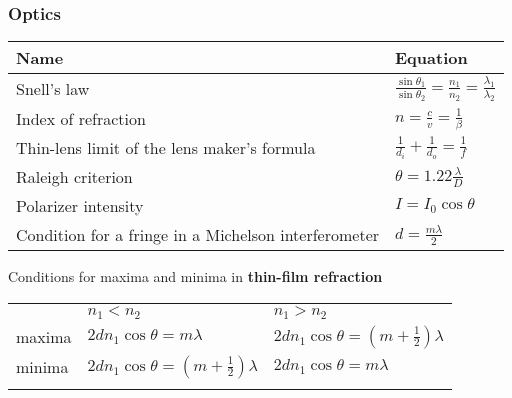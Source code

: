 \documentclass[11pt]{paper}
\begin{document}
\newpage
\subsubsection*{Optics}
\label{subsec:op}

\centering
\label{my-label}
\bgroup
\def\arraystretch{2}
\begin{longtable}{ll}
\textbf{Name}       & \textbf{Equation}          \\ \hline
\multicolumn{1}{|l|}{Snell's law} & \multicolumn{1}{l|}{$\frac{\sin\theta_1}{\sin\theta_2} = \frac{n_1}{n_2} = \frac{\lambda_1}{\lambda_2}$} \\ \hline
\multicolumn{1}{|l|}{Index of refraction} & \multicolumn{1}{l|}{$n =\frac{c}{v} = \frac{1}{\beta}$} \\ \hline
\multicolumn{1}{|l|}{Thin-lens limit of the lens maker's formula} & \multicolumn{1}{l|}{$\frac{1}{d_i} + \frac{1}{d_o} = \frac{1}{f}$} \\ \hline
\multicolumn{1}{|l|}{Raleigh criterion} & \multicolumn{1}{l|}{$\theta = 1.22\frac{\lambda}{D}$} \\ \hline
\multicolumn{1}{|l|}{Polarizer intensity} & \multicolumn{1}{l|}{$I = I_0\cos\theta$} \\ \hline
\multicolumn{1}{|l|}{Condition for a fringe in a Michelson interferometer} & \multicolumn{1}{l|}{$d = \frac{m\lambda}{2}$} \\ \hline


\end{longtable}
Conditions for maxima and minima in \textbf{thin-film refraction}
\begin{tabular}{lll}
                                  & $n_1<n_2$  & $n_1>n_2$     \\ \cline{2-3} 
\multicolumn{1}{l|}{maxima} & \multicolumn{1}{l|}{$2dn_1\cos{\theta} = m\lambda$} & \multicolumn{1}{l|}{$2dn_1\cos{\theta} = \left(m+\frac{1}{2}\right)\lambda$} \\ \cline{2-3} 
\multicolumn{1}{l|}{minima}  & \multicolumn{1}{l|}{$2dn_1\cos{\theta} = \left(m+\frac{1}{2}\right)\lambda$} & \multicolumn{1}{l|}{$2dn_1\cos{\theta} = m\lambda$} \\ \cline{2-3}\\ 
\end{tabular}
\end{document}
